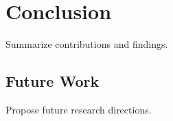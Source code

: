 \chapter{Conclusion}

Summarize contributions and findings.

\section{Future Work}
Propose future research directions.
